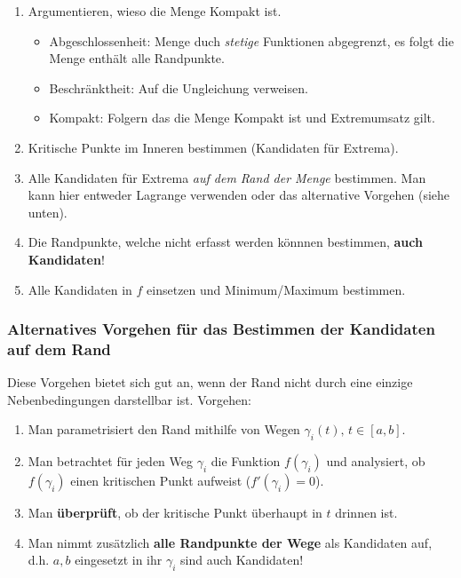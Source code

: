 \documentclass[a4paper, fontsize = 8pt, landscape]{scrartcl}
\begin{document}
\begin{multicols*}{3}
    \begin{enumerate}
        \item Argumentieren, wieso die Menge Kompakt ist.
              \begin{itemize}
                  \item Abgeschlossenheit: Menge duch \emph{stetige} Funktionen abgegrenzt, es folgt die Menge enthält alle Randpunkte.
                  \item Beschränktheit: Auf die Ungleichung verweisen.
                  \item Kompakt: Folgern das die Menge Kompakt ist und Extremumsatz gilt.
              \end{itemize}
        \item Kritische Punkte im Inneren bestimmen (Kandidaten für Extrema).
        \item Alle Kandidaten für Extrema \emph{auf dem Rand der Menge} bestimmen. Man kann hier entweder Lagrange verwenden oder das alternative Vorgehen (siehe unten).
        \item Die Randpunkte, welche nicht erfasst werden könnnen bestimmen, \textbf{auch Kandidaten}!
        \item Alle Kandidaten in $f$ einsetzen und Minimum/Maximum bestimmen.
    \end{enumerate}

    \subsubsection{Alternatives Vorgehen für das Bestimmen der Kandidaten auf dem Rand}

    Diese Vorgehen bietet sich gut an, wenn der Rand nicht durch eine einzige Nebenbedingungen darstellbar ist. Vorgehen:

    \begin{enumerate}
        \item Man parametrisiert den Rand mithilfe von Wegen $\gamma_i(t), \, t \in [a,b]$.
        \item Man betrachtet für jeden Weg $\gamma_i$ die Funktion $f(\gamma_i)$ und analysiert, ob $f(\gamma_i)$ einen kritischen Punkt aufweist ($f'(\gamma_i) = 0$).
        \item Man \textbf{überprüft}, ob der kritische Punkt überhaupt in $t$ drinnen ist.
        \item Man nimmt zusätzlich \textbf{alle Randpunkte der Wege} als Kandidaten auf, d.h. $a, b$ eingesetzt in ihr $\gamma_i$ sind auch Kandidaten!
    \end{enumerate}




\end{multicols*}
\end{document}
